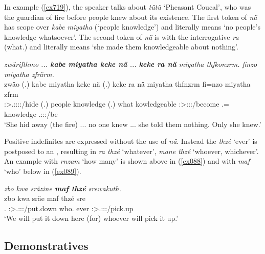In example (\ref{ex719}), the speaker talks about \emph{tütü} `Pheasant Coucal', who was the guardian of fire before people knew about its existence. The first token of \emph{nä} has scope over \emph{kabe miyatha} (`people knowledge') and literally means `no people's knowledge whatsoever'. The second token of \emph{nä} is with the interrogative \emph{ra} (what.\Abs{}) and literally means `she made them knowledgeable about nothing'.

\begin{exe}
	\ex \emph{zwärifthmo ... \textbf{kabe miyatha keke nä} ... \textbf{keke ra nä} miyatha thfkonzrm. finzo miyatha zfrärm.}\\
	\gll zwäo (.) kabe miyatha keke nä (.) keke ra nä miyatha thfnzrm fi=nzo miyatha zfrm\\
	\Tsg:\Sbj>\Tsg.\F:\Obj:\Rpst:\Pfv:\Andat/hide (.) people knowledge \Neg{} \Indf{} (.) \Neg{} what \Indf{} kowledgeable \Tsg:\Sbj>\Stpl:\Obj:\Pst:\Dur/become \Third.\Abs=\Only{} knowledge \Tsg.\F:\Sbj:\Pst:\Dur/be\\
	\trans `She hid away (the fire) ... no one knew ... she told them nothing. Only she knew.'
	\label{ex719}
\end{exe}

Positive indefinites are expressed without the use of \emph{nä}. Instead the  \emph{thzé} `ever' is postposed to an , resulting in \emph{ra thzé} `whatever', \emph{mane thzé} `whoever, whichever'. An example with \emph{rnzam} `how many' is shown above in (\ref{ex088}) and with \emph{maf} `who' below in (\ref{ex089}).

\begin{exe}
	\ex \emph{zbo kwa sräzine \textbf{maf thzé} srewakuth.}\\
	\gll zbo kwa sräe maf thzé sre\\
	\Prox{}.\All{} \Fut{} \Fpl{}:\Sbj>\Tsg{}.\Masc{}:\Obj{}:\Irr{}:\Pfv{}/put.down who.\Erg{} ever \Stsg{}:\Sbj{}>\Tsg{}.\Masc{}:\Obj{}:\Irr{}:\Pfv{}/pick.up\\
	\trans `We will put it down here (for) whoever will pick it up.'\\
	\label{ex089}
\end{exe}%

\subsection{Demonstratives} \label{demonstratives}


